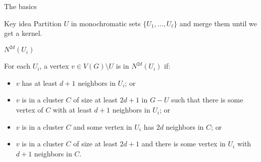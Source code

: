 \begin{frame}{The basics}
    \begin{block}{Key idea}
        Partition $U$ in monochromatic sets $\{U_1, \dots, U_\ell\}$ and merge them until we get a kernel.
    \end{block}
\end{frame}

\begin{frame}{$N^{2d}(U_i)$}
    \vspace{-0.3cm}
    \begin{block}{}
        For each $U_i$, a vertex $v \in V(G) \setminus U$ is in $N^{2d}(U_i)$ if:
        \begin{itemize}
            \item<2->[1] $v$ has at least $d+1$ neighbors in $U_i$; or
            \item<3->[2] $v$ is in a cluster $C$ of size at least $2d+1$ in $G - U$ such that there is some vertex of $C$ with at least $d+1$ neighbors in $U_i$; or
            \item<4->[3] $v$ is in a cluster $C$ and some vertex in $U_i$ has $2d$ neighbors in $C$; or
            \item<5->[4] $v$ is in a cluster $C$ of size at least $2d+1$ and there is some vertex in $U_i$ with $d+1$ neighbors in $C$.
        \end{itemize}
    \end{block}
    \begin{figure}[!htb]
        \centering
        \hspace*{1cm}
\end{figure}
\end{frame}
